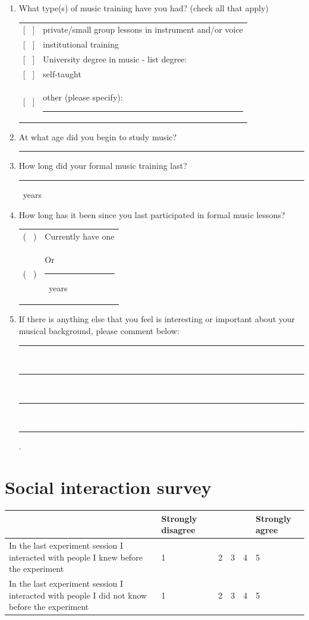 \documentclass[a4paper,11pt]{article}
\newcommand{\myunderline}{\rule{2in}{.5pt}}
\begin{document}
{\begin{appendices}
\begin{enumerate}[resume]
	\item What type(s) of music training have you had? (check all that apply)

	\begin{tabular}{l l}
		{[{ \ }]} & private/small group lessons in instrument and/or voice \\
		{[{ \ }]} & institutional training \\
		{[{ \ }]} & University degree in music - list degree: \\
		{[{ \ }]} & self-taught \\
		{[{ \ }]} & other (please specify): \myunderline \\
	\end{tabular}

 	\item At what age did you begin to study music?

 	\myunderline

 	\item How long did your formal music training last?

 	\myunderline \ years
 	\item How long has it been since you last participated in formal music lessons?

	\begin{tabular}{l l}
		( \ ) & Currently have one \\
		( \ ) & Or \myunderline \ years \\
	\end{tabular}

	\item \label{appendix:music:after_break}If there is anything else that you feel is interesting or important about your musical background, please comment below:

	\rule{4.5in}{.5pt} \\
	\rule{4.5in}{.5pt} \\
	\rule{4.5in}{.5pt} \\
	\rule{4.5in}{.5pt}.

\end{enumerate}

\section{Social interaction survey}

\begin{tabularx}{\textwidth}{p{2in} | Y Y Y Y Y }
	& Strongly disagree & & & & Strongly agree \\
	\hline
	In the last experiment session I interacted with people I knew before the experiment & 1 & 2 & 3 & 4 & 5 \\
	\hline
	In the last experiment session I interacted with people I did not know before the experiment & 1 & 2 & 3 & 4 & 5 \\
\end{tabularx}


\end{appendices}}
\end{document}

